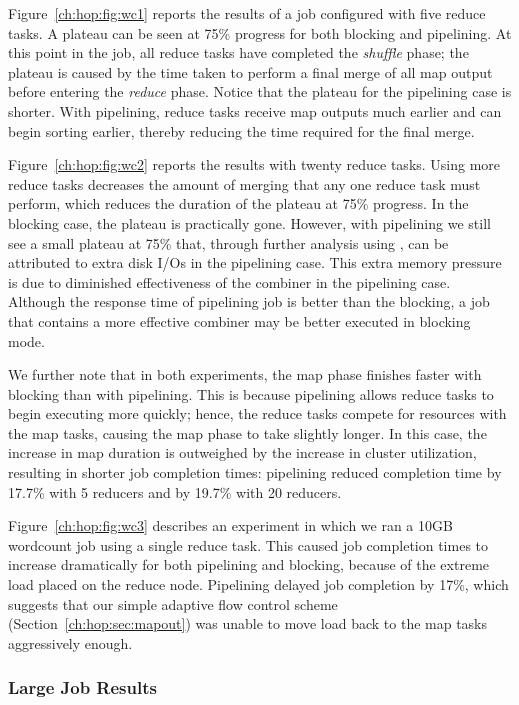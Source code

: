 Figure~\ref{ch:hop:fig:wc1} reports the results of a job configured with five
reduce tasks.  A plateau can be seen at 75\% progress for both blocking and
pipelining.  At this point in the job, all reduce tasks have completed the {\em
shuffle} phase; the plateau is caused by the time taken to perform a final
merge of all map output before entering the {\em reduce} phase.  Notice that
the plateau for the pipelining case is shorter.  With pipelining, reduce tasks
receive map outputs much earlier and can begin sorting earlier, thereby
reducing the time required for the final merge.

Figure~\ref{ch:hop:fig:wc2} reports the results with twenty reduce tasks.
Using more reduce tasks decreases the amount of merging that any one reduce
task must perform, which reduces the duration of the plateau at 75\% progress.
In the blocking case, the plateau is practically gone.  However, with
pipelining we still see a small plateau at 75\% that, through further analysis
using , can be attributed to extra disk I/Os in the pipelining case.
This extra memory pressure is due to diminished effectiveness of the combiner
in the pipelining case.  Although the response time of pipelining job is better
than the blocking, a job that contains a more effective combiner may be better
executed in blocking mode.

We further note that in both experiments, the map phase finishes faster with
blocking than with pipelining.  This is because pipelining allows reduce tasks
to begin executing more quickly; hence, the reduce tasks compete for resources
with the map tasks, causing the map phase to take slightly longer.  In this
case, the increase in map duration is outweighed by the increase in cluster
utilization, resulting in shorter job completion times: pipelining reduced
completion time by 17.7\% with 5 reducers and by 19.7\% with 20 reducers.

Figure~\ref{ch:hop:fig:wc3} describes an experiment in which we ran a 10GB
wordcount job using a single reduce task.  This caused job completion times to
increase dramatically for both pipelining and blocking, because of the extreme
load placed on the reduce node.  Pipelining delayed job completion by
\texttildelow{}17\%, which suggests that our simple adaptive flow control
scheme (Section~\ref{ch:hop:sec:mapout}) was unable to move load back to the
map tasks aggressively enough.

\subsubsection{Large Job Results}

